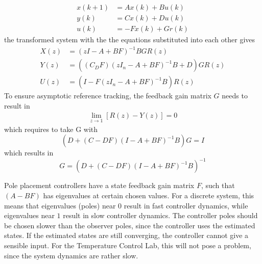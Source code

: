 \begin{align*}
    x(k+1) &= Ax(k)+Bu(k) \\
    y(k) &= Cx(k)+Du(k) \\
    u(k) &= -Fx(k) + Gr(k)
\end{align*}
the transformed system with the the equations substituted into each other gives
\begin{align*}
    X(z) &= (zI-A+BF)^{-1}BGR(z) \\
    Y(z) &=  ((C_DF)(zI_n-A+BF)^{-1}B+D)GR(z)\\
    U(z) &= (I-F(zI_n-A+BF)^{-1}B)R(z)
\end{align*}
To ensure asymptotic reference tracking, the feedback gain matrix $G$ needs to result in 
\begin{align*}
    \lim_{z \to 1}[R(z)-Y(z)]=0
\end{align*}
which requires to take G with
$$
(D+(C-DF)(I-A+BF)^{-1}B)G=I
$$
which results in
\begin{equation}
G = (D+(C-DF)(I-A+BF)^{-1}B)^{-1} \label{eq:refGain}    
\end{equation}

Pole placement controllers have a state feedback gain matrix $F$, such that $(A-BF)$ has eigenvalues at certain chosen values. For a discrete system, this means that eigenvalues (poles) near $0$ result in fast controller dynamics, while eigenvalues near $1$ result in slow controller dynamics. The controller poles should be chosen slower than the observer poles, since the controller uses the estimated states. If the estimated states are still converging, the controller cannot give a sensible input. For the Temperature Control Lab, this will not pose a problem, since the system dynamics are rather slow.\\

